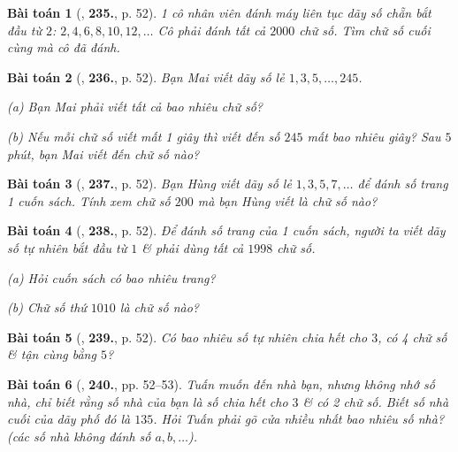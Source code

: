 \documentclass{article}
\numberwithin{equation}{section}
\newtheorem{baitoan}{Bài toán}
\begin{document}
\begin{baitoan}[\cite{Binh_Toan_6_tap_1}, \textbf{235.}, p. 52]
	1 cô nhân viên đánh máy liên tục dãy số chẵn bắt đầu từ $2$: $2,4,6,8,10,12,\ldots$ Cô phải đánh tất cả $2000$ chữ số. Tìm chữ số cuối cùng mà cô đã đánh.
\end{baitoan}

\begin{baitoan}[\cite{Binh_Toan_6_tap_1}, \textbf{236.}, p. 52]
	Bạn Mai viết dãy số lẻ $1,3,5,\ldots,245$.
	\begin{enumerate*}
		\item[(a)] Bạn Mai phải viết tất cả bao nhiêu chữ số?
		\item[(b)] Nếu mỗi chữ số viết mất 1 giây thì viết đến số $245$ mất bao nhiêu giây? Sau $5$ phút, bạn Mai viết đến chữ số nào?
	\end{enumerate*}
\end{baitoan}

\begin{baitoan}[\cite{Binh_Toan_6_tap_1}, \textbf{237.}, p. 52]
	Bạn Hùng viết dãy số lẻ $1,3,5,7,\ldots$ để đánh số trang 1 cuốn sách. Tính xem chữ số $200$ mà bạn Hùng viết là chữ số nào?
\end{baitoan}

\begin{baitoan}[\cite{Binh_Toan_6_tap_1}, \textbf{238.}, p. 52]
	Để đánh số trang của 1 cuốn sách, người ta viết dãy số tự nhiên bắt đầu từ $1$ \& phải dùng tất cả $1998$ chữ số.
	\begin{enumerate*}
		\item[(a)] Hỏi cuốn sách có bao nhiêu trang?
		\item[(b)] Chữ số thứ $1010$ là chữ số nào?
	\end{enumerate*}
\end{baitoan}

\begin{baitoan}[\cite{Binh_Toan_6_tap_1}, \textbf{239.}, p. 52]
	Có bao nhiêu số tự nhiên chia hết cho $3$, có 4 chữ số \& tận cùng bằng $5$?
\end{baitoan}

\begin{baitoan}[\cite{Binh_Toan_6_tap_1}, \textbf{240.}, pp. 52--53]
	Tuấn muốn đến nhà bạn, nhưng không nhớ số nhà, chỉ biết rằng số nhà của bạn là số chia hết cho $3$ \& có 2 chữ số. Biết số nhà cuối của dãy phố đó là $135$. Hỏi Tuấn phải gõ cửa nhiều nhất bao nhiêu số nhà? (các số nhà không đánh số $a,b,\ldots$).
\end{baitoan}
\end{document}
